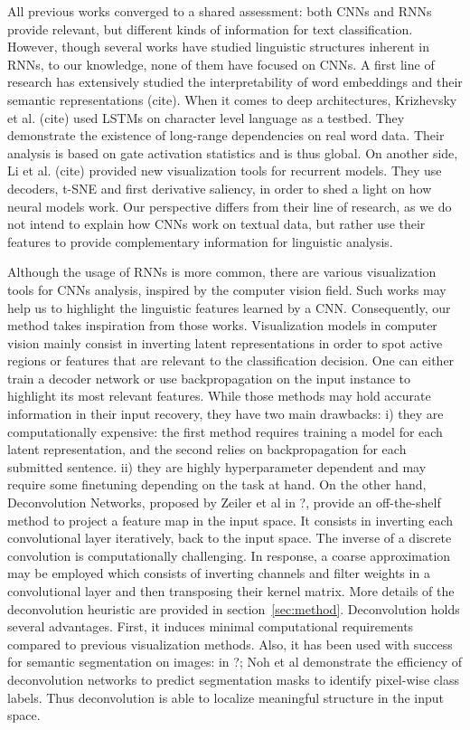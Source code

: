  All previous works converged to a shared assessment: both CNNs and RNNs provide relevant, but different kinds of information for text classification. 
 However, though several works have studied linguistic structures inherent in RNNs, to our knowledge, none of them have focused on CNNs. 
 A first line of research has extensively studied the interpretability of word embeddings and their semantic representations (cite). 
 When it comes to deep architectures, Krizhevsky et al. (cite) used LSTMs on character level language as a testbed. They demonstrate the existence of 
 long-range dependencies on real word data. Their analysis is based on gate activation statistics and is thus global. On another side, Li et al. (cite)
 provided new visualization tools for recurrent models. They use decoders, t-SNE and first derivative saliency, in order to shed a light on how neural models work.
Our perspective differs from their line of research, as we do not intend to explain how CNNs work on textual data, but rather use their features 
to provide complementary information for linguistic analysis.

Although the usage of RNNs is more common, there are various visualization tools for CNNs analysis, 
inspired by the computer vision field. Such works may help us to highlight the linguistic features learned by a 
CNN. Consequently, our method takes inspiration from those works. Visualization models in computer vision mainly consist 
in inverting latent representations in order to spot active regions or features that are relevant to the classification decision.
One can either train a decoder network or use backpropagation on the input instance to highlight its most relevant features. 
While those methods may hold accurate information in their input recovery, they have two main drawbacks: 
i) they are computationally expensive: the first method requires training a model for each latent representation, and the second relies 
on backpropagation for each submitted sentence. ii) they are highly hyperparameter dependent and may require some finetuning depending on the task at hand.
On the other hand, Deconvolution Networks, proposed by Zeiler et al in ?, provide an off-the-shelf method to project a feature map in the input 
space. It consists in inverting each convolutional layer iteratively, back to the input space. The inverse of a discrete convolution is 
computationally challenging. In response, a coarse approximation may be employed which consists of inverting channels and filter weights 
in a convolutional layer and then transposing their kernel matrix. More details of the deconvolution heuristic are provided in section~\ref{sec:method}.
Deconvolution holds several advantages. First, it induces minimal computational requirements compared to previous visualization methods. 
Also, it has been used with success for semantic segmentation on images: in ?; Noh et al demonstrate the efficiency of deconvolution networks 
to predict segmentation masks to identify pixel-wise class labels. Thus deconvolution is able to localize meaningful structure in the input space.
